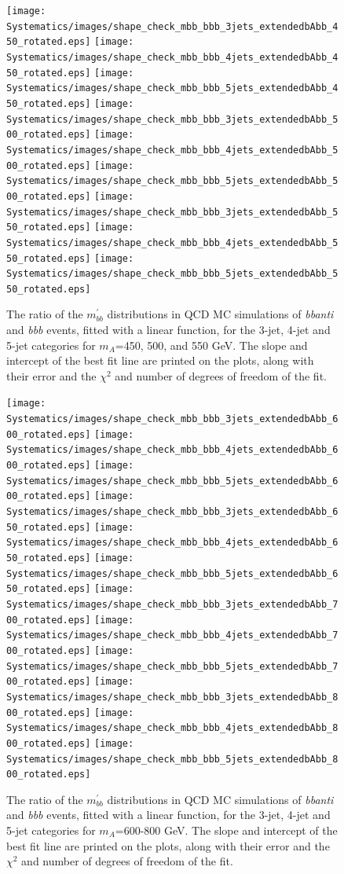 \begin{figure}
    \center
  \texttt{[image: Systematics/images/shape\_check\_mbb\_bbb\_3jets\_extendedbAbb\_450\_rotated.eps]}
  \texttt{[image: Systematics/images/shape\_check\_mbb\_bbb\_4jets\_extendedbAbb\_450\_rotated.eps]}
  \texttt{[image: Systematics/images/shape\_check\_mbb\_bbb\_5jets\_extendedbAbb\_450\_rotated.eps]}
  \texttt{[image: Systematics/images/shape\_check\_mbb\_bbb\_3jets\_extendedbAbb\_500\_rotated.eps]}
  \texttt{[image: Systematics/images/shape\_check\_mbb\_bbb\_4jets\_extendedbAbb\_500\_rotated.eps]}
  \texttt{[image: Systematics/images/shape\_check\_mbb\_bbb\_5jets\_extendedbAbb\_500\_rotated.eps]}
  \texttt{[image: Systematics/images/shape\_check\_mbb\_bbb\_3jets\_extendedbAbb\_550\_rotated.eps]}
  \texttt{[image: Systematics/images/shape\_check\_mbb\_bbb\_4jets\_extendedbAbb\_550\_rotated.eps]}
  \texttt{[image: Systematics/images/shape\_check\_mbb\_bbb\_5jets\_extendedbAbb\_550\_rotated.eps]}
  \caption{The ratio of the $m^{'}_{bb}$ distributions in QCD MC simulations of \textit{bbanti}
  and \textit{bbb} events, fitted with a linear function, for the 3-jet, 4-jet and 5-jet categories for 
  $m_A$=450, 500, and 550 GeV.
  The slope and intercept of the best fit line are printed on the plots, along with their error
  and the $\chi^2$ and number of degrees of freedom of the fit.\label{fig:shape_checks_bg_1}}    
\end{figure}                                                                                                                        
\begin{figure}
    \center
  \texttt{[image: Systematics/images/shape\_check\_mbb\_bbb\_3jets\_extendedbAbb\_600\_rotated.eps]}
  \texttt{[image: Systematics/images/shape\_check\_mbb\_bbb\_4jets\_extendedbAbb\_600\_rotated.eps]}
  \texttt{[image: Systematics/images/shape\_check\_mbb\_bbb\_5jets\_extendedbAbb\_600\_rotated.eps]}
  \texttt{[image: Systematics/images/shape\_check\_mbb\_bbb\_3jets\_extendedbAbb\_650\_rotated.eps]}
  \texttt{[image: Systematics/images/shape\_check\_mbb\_bbb\_4jets\_extendedbAbb\_650\_rotated.eps]}
  \texttt{[image: Systematics/images/shape\_check\_mbb\_bbb\_5jets\_extendedbAbb\_650\_rotated.eps]}
  \texttt{[image: Systematics/images/shape\_check\_mbb\_bbb\_3jets\_extendedbAbb\_700\_rotated.eps]}
  \texttt{[image: Systematics/images/shape\_check\_mbb\_bbb\_4jets\_extendedbAbb\_700\_rotated.eps]}
  \texttt{[image: Systematics/images/shape\_check\_mbb\_bbb\_5jets\_extendedbAbb\_700\_rotated.eps]}
  \texttt{[image: Systematics/images/shape\_check\_mbb\_bbb\_3jets\_extendedbAbb\_800\_rotated.eps]}
  \texttt{[image: Systematics/images/shape\_check\_mbb\_bbb\_4jets\_extendedbAbb\_800\_rotated.eps]}
  \texttt{[image: Systematics/images/shape\_check\_mbb\_bbb\_5jets\_extendedbAbb\_800\_rotated.eps]}
  \caption{The ratio of the $m^{'}_{bb}$ distributions in QCD MC simulations of \textit{bbanti}
  and \textit{bbb} events, fitted with a linear function, for the 3-jet, 4-jet and 5-jet categories for 
  $m_A$=600-800 GeV.
  The slope and intercept of the best fit line are printed on the plots, along with their error
  and the $\chi^2$ and number of degrees of freedom of the fit.\label{fig:shape_checks_bg_2}}    
\end{figure}

